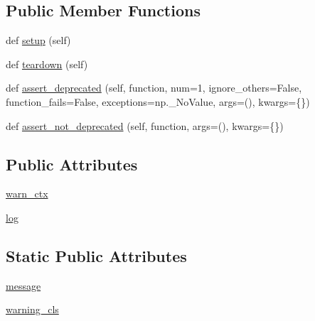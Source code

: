 \subsection*{Public Member Functions}
\begin{DoxyCompactItemize}
\item 
def \hyperlink{classnumpy_1_1core_1_1tests_1_1test__deprecations_1_1__DeprecationTestCase_aaeef5af13295c5fe06322f9d3d829977}{setup} (self)
\item 
def \hyperlink{classnumpy_1_1core_1_1tests_1_1test__deprecations_1_1__DeprecationTestCase_a20780e53d7fe66bdd00b36047b3d9669}{teardown} (self)
\item 
def \hyperlink{classnumpy_1_1core_1_1tests_1_1test__deprecations_1_1__DeprecationTestCase_a0d6477d2c79624c6a9ec63d3e5503571}{assert\+\_\+deprecated} (self, function, num=1, ignore\+\_\+others=False, function\+\_\+fails=False, exceptions=np.\+\_\+\+No\+Value, args=(), kwargs=\{\})
\item 
def \hyperlink{classnumpy_1_1core_1_1tests_1_1test__deprecations_1_1__DeprecationTestCase_af8dcb2b22687abd6271dc97c5b7c258a}{assert\+\_\+not\+\_\+deprecated} (self, function, args=(), kwargs=\{\})
\end{DoxyCompactItemize}
\subsection*{Public Attributes}
\begin{DoxyCompactItemize}
\item 
\hyperlink{classnumpy_1_1core_1_1tests_1_1test__deprecations_1_1__DeprecationTestCase_a5d8f3dbe51cfac5cc9f1c733d2b836f8}{warn\+\_\+ctx}
\item 
\hyperlink{classnumpy_1_1core_1_1tests_1_1test__deprecations_1_1__DeprecationTestCase_a960158952dd880cb14a2ede10f1fe474}{log}
\end{DoxyCompactItemize}
\subsection*{Static Public Attributes}
\begin{DoxyCompactItemize}
\item 
\hyperlink{classnumpy_1_1core_1_1tests_1_1test__deprecations_1_1__DeprecationTestCase_ab4f607f7e5893d1521ca0e6f79f3e898}{message}
\item 
\hyperlink{classnumpy_1_1core_1_1tests_1_1test__deprecations_1_1__DeprecationTestCase_aaf0ae6e0a7f5c5bb6609954fa7bb59bb}{warning\+\_\+cls}
\end{DoxyCompactItemize}


